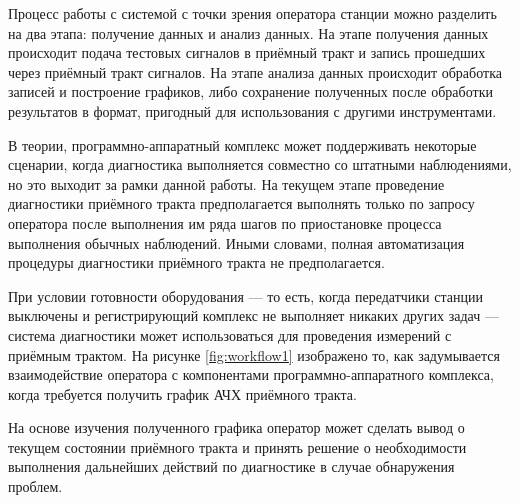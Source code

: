 \documentclass{report}
\begin{document}
Процесс работы с системой с точки зрения оператора станции можно разделить на два этапа: получение данных и анализ данных. На этапе получения данных происходит подача тестовых сигналов в приёмный тракт и запись прошедших через приёмный тракт сигналов. На этапе анализа данных происходит обработка записей и построение графиков, либо сохранение полученных после обработки результатов в формат, пригодный для использования с другими инструментами.

В теории, программно-аппаратный комплекс может поддерживать некоторые сценарии, когда диагностика выполняется совместно со штатными наблюдениями, но это выходит за рамки данной работы. На текущем этапе проведение диагностики приёмного тракта предполагается выполнять только по запросу оператора после выполнения им ряда шагов по приостановке процесса выполнения обычных наблюдений. Иными словами, полная автоматизация процедуры диагностики приёмного тракта не предполагается.

При условии готовности оборудования --- то есть, когда передатчики станции выключены и регистрирующий комплекс не выполняет никаких других задач --- система диагностики может использоваться для проведения измерений с приёмным трактом. На рисунке \ref{fig:workflow1} изображено то, как задумывается взаимодействие оператора с компонентами программно-аппаратного комплекса, когда требуется получить график АЧХ приёмного тракта.


На основе изучения полученного графика оператор может сделать вывод о текущем состоянии приёмного тракта и принять решение о необходимости выполнения дальнейших действий по диагностике в случае обнаружения проблем.




\end{document}

